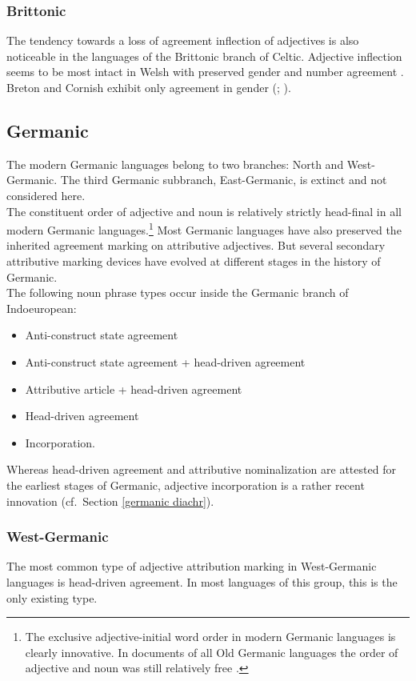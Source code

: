 \subsubsection{Brittonic}
The tendency towards a loss of agreement inflection of adjectives is also noticeable in the languages of the Brittonic branch of Celtic. Adjective inflection seems to be most intact in Welsh with preserved gender and number agreement \cite[298–299]{thomas1992a}. Breton and Cornish exhibit only agreement in gender (\citealt[405]{ternes1992}; \citealt[355]{thomas1992b}).

\subsection{Germanic}
The modern Germanic languages belong to two branches: North  and West-Germanic. The third Germanic subbranch, East-Germanic, is extinct and not considered here.\\

\noindent The constituent order of adjective and noun is relatively strictly head-final in all modern Germanic languages.\footnote{The exclusive adjective-initial word order in modern Germanic languages is clearly innovative. In documents of all Old Germanic languages the order of adjective and noun was still relatively free \citep[cf.][]{heinrichs1954}.}  Most Germanic languages have also preserved the inherited agreement marking on attributive adjectives. But several secondary attributive marking devices have evolved at different stages in the history of Germanic.\\

\noindent The following noun phrase types occur inside the Germanic branch of Indoeuropean:
\begin{itemize}
\item{Anti-construct state agreement}
\item{Anti-construct state agreement + head-driven agreement}
\item{Attributive article + head-driven agreement}
\item{Head-driven agreement}
\item{Incorporation.}
\end{itemize}
Whereas head-driven agreement and attributive nominalization are attested for the earliest stages of Germanic, adjective incorporation is a rather recent innovation (cf.~Section \ref{germanic diachr}).

\subsubsection{West-Germanic}\label{w-germanic synchr}
The most common type of adjective attribution marking in West-Germanic languages is head-driven agreement. In most languages of this group, this is the only existing type.

